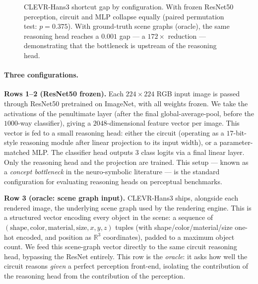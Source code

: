 \documentclass{article}
\newcommand{\R}{\mathbb{R}}
\begin{document}
\begin{figure}[H]
\centering
{}
\caption{CLEVR-Hans3 shortcut gap by configuration. With frozen ResNet50 perception, circuit and MLP collapse equally (paired permutation test: $p{=}0.375$). With ground-truth scene graphs (oracle), the same reasoning head reaches a $0.001$ gap --- a $172\times$ reduction --- demonstrating that the bottleneck is upstream of the reasoning head.}
\label{fig:clevr_bar}
\end{figure}

\paragraph{Three configurations.}
\textbf{Rows 1--2 (ResNet50 frozen).} Each $224 \times 224$ RGB input image is passed through ResNet50 pretrained on ImageNet, with all weights frozen. We take the activations of the penultimate layer (after the final global-average-pool, before the $1000$-way classifier), giving a $2048$-dimensional feature vector per image. This vector is fed to a small reasoning head: either the circuit (operating as a $17$-bit-style reasoning module after linear projection to its input width), or a parameter-matched MLP. The classifier head outputs $3$ class logits via a final linear layer. Only the reasoning head and the projection are trained. This setup --- known as a \emph{concept bottleneck} in the neuro-symbolic literature --- is the standard configuration for evaluating reasoning heads on perceptual benchmarks.

\textbf{Row 3 (oracle: scene graph input).} CLEVR-Hans3 ships, alongside each rendered image, the underlying scene graph used by the rendering engine. This is a structured vector encoding every object in the scene: a sequence of $(\text{shape}, \text{color}, \text{material}, \text{size}, x, y, z)$ tuples (with shape/color/material/size one-hot encoded, and position as $\R^3$ coordinates), padded to a maximum object count. We feed this scene-graph vector directly to the same circuit reasoning head, bypassing the ResNet entirely. This row is the \emph{oracle}: it asks how well the circuit reasons \emph{given} a perfect perception front-end, isolating the contribution of the reasoning head from the contribution of the perception.
\end{document}
